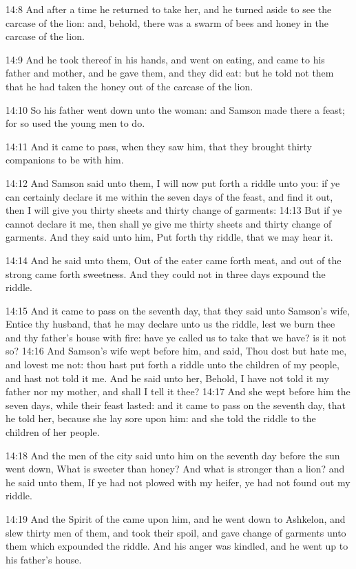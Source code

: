 14:8 And after a time he returned to take her, and he turned aside to
see the carcase of the lion: and, behold, there was a swarm of bees
and honey in the carcase of the lion.

14:9 And he took thereof in his hands, and went on eating, and came to
his father and mother, and he gave them, and they did eat: but he told
not them that he had taken the honey out of the carcase of the lion.

14:10 So his father went down unto the woman: and Samson made there a
feast; for so used the young men to do.

14:11 And it came to pass, when they saw him, that they brought thirty
companions to be with him.

14:12 And Samson said unto them, I will now put forth a riddle unto
you: if ye can certainly declare it me within the seven days of the
feast, and find it out, then I will give you thirty sheets and thirty
change of garments: 14:13 But if ye cannot declare it me, then shall
ye give me thirty sheets and thirty change of garments. And they said
unto him, Put forth thy riddle, that we may hear it.

14:14 And he said unto them, Out of the eater came forth meat, and out
of the strong came forth sweetness. And they could not in three days
expound the riddle.

14:15 And it came to pass on the seventh day, that they said unto
Samson's wife, Entice thy husband, that he may declare unto us the
riddle, lest we burn thee and thy father's house with fire: have ye
called us to take that we have? is it not so?  14:16 And Samson's wife
wept before him, and said, Thou dost but hate me, and lovest me not:
thou hast put forth a riddle unto the children of my people, and hast
not told it me. And he said unto her, Behold, I have not told it my
father nor my mother, and shall I tell it thee?  14:17 And she wept
before him the seven days, while their feast lasted: and it came to
pass on the seventh day, that he told her, because she lay sore upon
him: and she told the riddle to the children of her people.

14:18 And the men of the city said unto him on the seventh day before
the sun went down, What is sweeter than honey? And what is stronger
than a lion?  and he said unto them, If ye had not plowed with my
heifer, ye had not found out my riddle.

14:19 And the Spirit of the \LORD came upon him, and he went down to
Ashkelon, and slew thirty men of them, and took their spoil, and gave
change of garments unto them which expounded the riddle. And his anger
was kindled, and he went up to his father's house.

